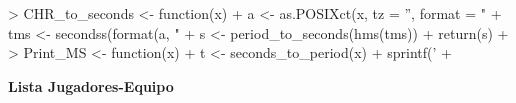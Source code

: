 \documentclass[paper=a4, fontsize=9pt]{article}
\begin{document}
\begin{Schunk}
\begin{Sinput}
> CHR_to_seconds <- function(x){
+   a <- as.POSIXct(x, tz = '', format = "%
+   tms <- secondss(format(a, "%
+   s <- period_to_seconds(hms(tms))
+   return(s)
+ }
> Print_MS <- function(x){
+   t <- seconds_to_period(x)
+   sprintf('%
+ }
\end{Sinput}
\end{Schunk}

\textbf{Lista Jugadores-Equipo}
\end{document}
